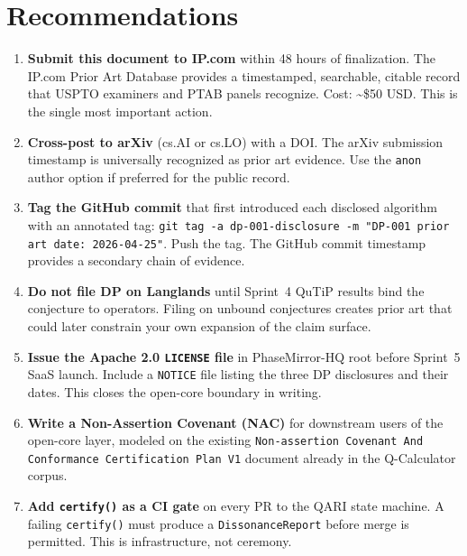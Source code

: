 \documentclass[12pt,letterpaper]{article}
\begin{document}
\section{Recommendations}

\begin{enumerate}
  \item \textbf{Submit this document to IP.com} within 48 hours of
        finalization. The IP.com Prior Art Database provides a
        timestamped, searchable, citable record that USPTO examiners
        and PTAB panels recognize. Cost: \textasciitilde\$50 USD.
        This is the single most important action.

  \item \textbf{Cross-post to arXiv} (cs.AI or cs.LO) with a DOI.
        The arXiv submission timestamp is universally recognized as
        prior art evidence. Use the \texttt{anon} author option if
        preferred for the public record.

  \item \textbf{Tag the GitHub commit} that first introduced each
        disclosed algorithm with an annotated tag:
        \texttt{git tag -a dp-001-disclosure -m "DP-001 prior art
        date: 2026-04-25"}. Push the tag. The GitHub commit timestamp
        provides a secondary chain of evidence.

  \item \textbf{Do not file DP on Langlands} until Sprint~4 QuTiP
        results bind the conjecture to operators. Filing on unbound
        conjectures creates prior art that could later constrain your
        own expansion of the claim surface.

  \item \textbf{Issue the Apache 2.0 \texttt{LICENSE} file} in
        PhaseMirror-HQ root before Sprint~5 SaaS launch. Include a
        \texttt{NOTICE} file listing the three DP disclosures and their
        dates. This closes the open-core boundary in writing.

  \item \textbf{Write a Non-Assertion Covenant (NAC)} for downstream
        users of the open-core layer, modeled on the existing
        \texttt{Non-assertion Covenant And Conformance Certification
        Plan V1} document already in the Q-Calculator corpus.

  \item \textbf{Add \texttt{certify()} as a CI gate} on every PR to
        the QARI state machine. A failing \texttt{certify()} must
        produce a \texttt{DissonanceReport} before merge is permitted.
        This is infrastructure, not ceremony.
\end{enumerate}
\end{document}
